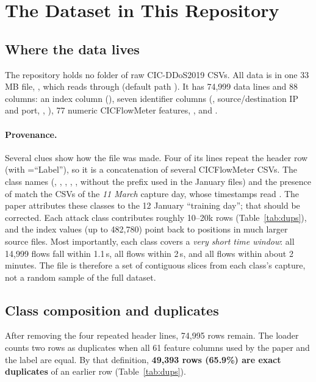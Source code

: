 \section{The Dataset in This Repository}
\label{sec:dataset}

\subsection{Where the data lives}
The repository holds no folder of raw CIC-DDoS2019 CSVs. All data is in one 33\,MB file,
, which  reads through  (default path
). It has 74{,}999 data lines and 88 columns: an index column
(), seven identifier columns (, source/destination IP and port,
, ), 77 numeric CICFlowMeter features, ,
 and .

\paragraph{Provenance.} Several clues show how the file was made. Four of its lines repeat the
header row (with =``Label''), so it is a concatenation of several CICFlowMeter CSVs.
The class names (, , , , , without the
 prefix used in the January files) and the presence of  match the
CSVs of the \emph{11 March} capture day, whose timestamps read . The paper
attributes these classes to the 12 January ``training day''; that should be corrected. Each attack
class contributes roughly 10--20k rows (Table~\ref{tab:dups}), and the  index
values (up to 482{,}780) point back to positions in much larger source files. Most importantly,
each class covers a \emph{very short time window}: all 14{,}999  flows fall within
1.1\,s, all  flows within 2\,s, and all  flows within about 2 minutes. The
file is therefore a set of contiguous slices from each class's capture, not a random sample of
the full dataset.

\subsection{Class composition and duplicates}
After removing the four repeated header lines, 74{,}995 rows remain. The loader counts two rows
as duplicates when all 61 feature columns used by the paper and the label are equal. By that
definition, \textbf{49{,}393 rows (65.9\%) are exact duplicates} of an earlier row
(Table~\ref{tab:dups}).

